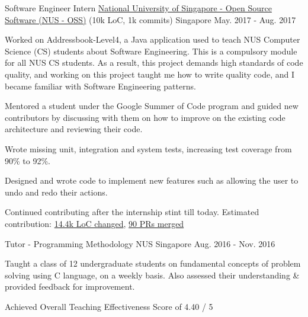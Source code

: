 \begin{cventries}
  \cventry
    {Software Engineer Intern} %
    {\href{https://github.com/se-edu/addressbook-level4}{National University of Singapore - Open Source Software (NUS - OSS)} (10k LoC, 1k commits)} %
    {Singapore} %
    {May. 2017 - Aug. 2017} %
    {
      \begin{cvitems} %
        \item {Worked on Addressbook-Level4, a Java application used to teach NUS Computer Science (CS) students about Software Engineering. This is a compulsory module for all NUS CS students. As a result, this project demands high standards of code quality, and working on this project taught me how to write quality code, and I became familiar with Software Engineering patterns.}
        \item {Mentored a student under the Google Summer of Code program and guided new contributors by discussing with them on how to improve on the existing code architecture and reviewing their code.}
        \item {Wrote missing unit, integration and system tests, increasing test coverage from 90\% to 92\%.}
        \item {Designed and wrote code to implement new features such as allowing the user to undo and redo their actions.}
        \item {Continued contributing after the internship stint till today. Estimated contribution: \href{https://github.com/se-edu/addressbook-level4/graphs/contributors}{\color{teal}14.4k LoC changed}, \href{https://github.com/se-edu/addressbook-level4/pulls?utf8=\%E2\%9C\%93&q=is\%3Apr+is\%3Aclosed+author\%3AZhiyuan-Amos+is\%3Amerged}{\color{teal}90 PRs merged}}
      \end{cvitems}
    }
 

  \cventry
    {Tutor - Programming Methodology} %
    {NUS} %
    {Singapore} %
    {Aug. 2016 - Nov. 2016} %
    {
      \begin{cvitems} %
        \item {Taught a class of 12 undergraduate students on fundamental concepts of problem solving using C language, on a weekly basis. Also assessed their understanding \& provided feedback for improvement.}
        \item {Achieved Overall Teaching Effectiveness Score of 4.40 / 5}
      \end{cvitems}
    }

\end{cventries}
